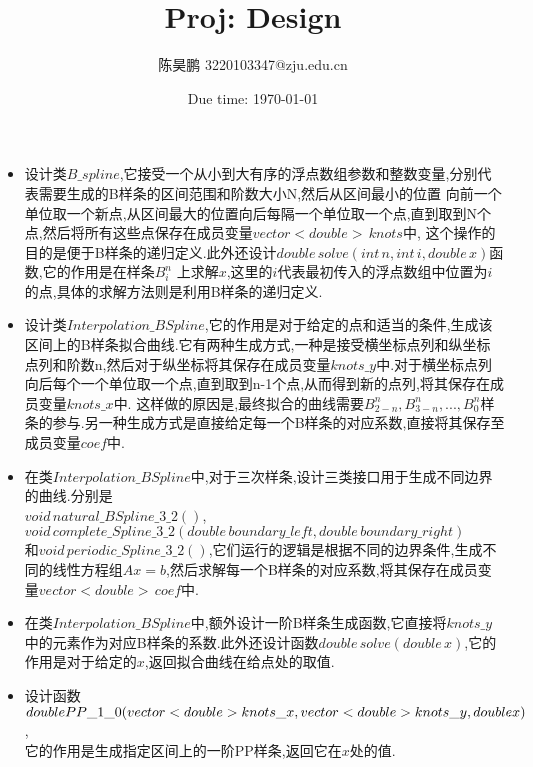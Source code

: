 \documentclass[a4paper]{article}
\begin{document}
\title{Proj: Design}

\author{陈昊鹏  3220103347@zju.edu.cn}


\date{Due time: \today}

\maketitle
\begin{itemize}
    \item 设计类$B\_spline$,它接受一个从小到大有序的浮点数组参数和整数变量,分别代表需要生成的B样条的区间范围和阶数大小N,然后从区间最小的位置
    向前一个单位取一个新点,从区间最大的位置向后每隔一个单位取一个点,直到取到N个点,然后将所有这些点保存在成员变量$vector<double> \, knots$中,
    这个操作的目的是便于B样条的递归定义.此外还设计$double \, solve(int \, n,int \, i,double \, x)$函数,它的作用是在样条$B_{i}^{n}$
    上求解$x$,这里的$i$代表最初传入的浮点数组中位置为$i$的点,具体的求解方法则是利用B样条的递归定义.
    \item 设计类$Interpolation\_BSpline$,它的作用是对于给定的点和适当的条件,生成该区间上的B样条拟合曲线.它有两种生成方式,一种是接受横坐标点列和纵坐标
    点列和阶数n,然后对于纵坐标将其保存在成员变量$knots\_y$中.对于横坐标点列向后每个一个单位取一个点,直到取到n-1个点,从而得到新的点列,将其保存在成员变量$knots\_x$中.
    这样做的原因是,最终拟合的曲线需要$B_{2-n}^{n},B_{3-n}^{n},...,B_{0}^{n}$样条的参与.另一种生成方式是直接给定每一个B样条的对应系数,直接将其保存至成员变量$coef$中.
    \item 在类$Interpolation\_BSpline$中,对于三次样条,设计三类接口用于生成不同边界的曲线.分别是\\
    $void \, natural\_BSpline\_3\_2()$,$void \, complete\_Spline\_3\_2(double \, boundary\_left,double \, boundary\_right)$\\
    和$void \, periodic\_Spline\_3\_2()$,它们运行的逻辑是根据不同的边界条件,生成不同的线性方程组$Ax=b$,然后求解每一个B样条的对应系数,将其保存在成员变量$vector<double> \, coef$中.
    \item 在类$Interpolation\_BSpline$中,额外设计一阶B样条生成函数,它直接将$knots\_y$中的元素作为对应B样条的系数.此外还设计函数$double \, solve(double \, x)$,它的作用是对于给定的$x$,返回拟合曲线在给点处的取值.
    \item 设计函数$double \space PP\_1\_0(vector<double>  knots\_x,vector<double>knots\_y,double x)$,\\
    它的作用是生成指定区间上的一阶PP样条,返回它在$x$处的值.

\end{itemize}
\end{document}
